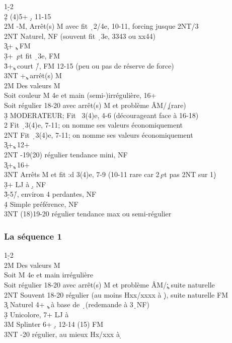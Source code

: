 \documentclass[a4paper]{article}
\begin{document}
\begin{bidtable}
1\d-2\c\\
2\d \> (4)5+ \d , 11-15\+\\
2M -M, Arrêt(s) M avec fit \d\ 2/4e, 10-11, forcing jusque 2NT/3\d \\
2NT \> Naturel, NF (souvent fit \d\ 3e, 3343 ou xx44)\\
3\c {}+ \c , FM\\
3\d {}+ \c\ et fit \d\ 3e, FM\\
3\h\s {}+\c , court \h /\s , FM 12-15 (peu ou pas de réserve de force)\\
3NT +\c , arrêt(s) M\-\\
2M \> Des valeurs M\+\\
Soit \> couleur M 4e et main (semi-)irrégulière, 16+\\
Soit \> régulier 18-20 avec arrêt(s) M et problème ÂM/\c\ (rare)\\
3\d \> MODERATEUR; Fit \s\ 3(4)e, 4-6 (décourageant face à 16-18)\\
2\s \> Fit \d\ 3(4)e, 7-11; on nomme ses valeurs économiquement\\
2NT \> Fit \d\ 3(4)e, 7-11; on nomme ses valeurs économiquement\\
3\c {}+\c , 12+\-\\
2NT -19(20) régulier tendance mini, NF\\
3\c {}+\c , 16+\+\\
3NT \> Arrêts M et fit :d 3(4)e, 7-9 (10-11 rare car 2\c\ et pas 2NT sur 1\d )\-\\
3\d {}+ LJ à \d , NF\\
3\h\s {}\d -5\h /\s , environ 4 perdantes, NF\+\\
4\d \> Simple préférence, NF\-\\
3NT \> (18)19-20 régulier tendance max ou semi-régulier
\end{bidtable}

\subsubsection{La séquence 1\pdfd}

\begin{bidtable}
1\d-2\d\\
2M \> Des valeurs M\+\\
Soit \> M 4e et main irrégulière\\
Soit \> régulier 18-20 avec arrêt(s) M et problème ÂM/\c ; suite naturelle\-\\
2NT \> Souvent 18-20 régulier (au moins Hxx/xxxx à \d ), suite naturelle FM\\
3\c \> Naturel 4+ \c , à base de \d\ (redemande à 3\d\ NF)\\
3\d \> Unicolore, 7+ LJ à \d \\
3M \> Splinter 6+ \d , 12-14 (15) FM\\
3NT -20 régulier, au mieux Hx/xxx à \d 
\end{bidtable}
\end{document}
